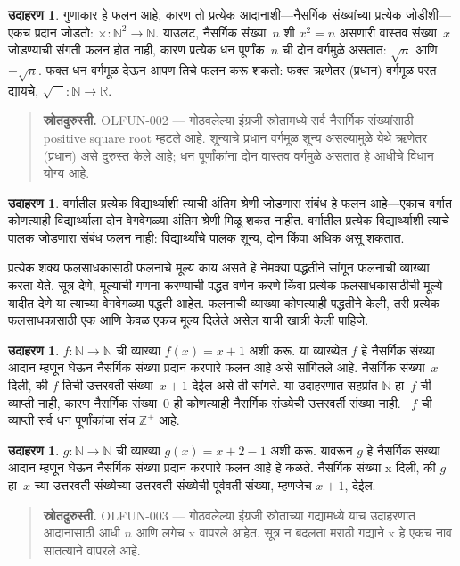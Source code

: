 \documentclass[11pt,a4paper,openany]{book}
\theoremstyle{definition}
\newtheorem{ex}[defn]{उदाहरण}
\newenvironment{explain}{}{}
\newcommand{\Nat}{\mathbb{N}}
\newcommand{\Int}{\mathbb{Z}}
\newcommand{\Real}{\mathbb{R}}
\begin{document}
\begin{ex}
गुणाकार हे फलन आहे, कारण तो प्रत्येक आदानाशी---नैसर्गिक संख्यांच्या
प्रत्येक जोडीशी---एकच प्रदान जोडतो: $\times \colon \Nat^2 \to \Nat$.
याउलट, नैसर्गिक संख्या~$n$ शी $x^2 = n$ असणारी वास्तव संख्या~$x$
जोडण्याची संगती फलन होत नाही, कारण प्रत्येक धन पूर्णांक~$n$ ची दोन
वर्गमुळे असतात: $\sqrt{n}$ आणि~$-\sqrt{n}$. फक्त धन वर्गमूळ देऊन
आपण तिचे फलन करू शकतो: फक्त ऋणेतर (प्रधान) वर्गमूळ परत द्यायचे,
$\sqrt{\phantom{X}} \colon \Nat \to \Real$.
\end{ex}
\begin{quote}\small\textbf{स्रोतदुरुस्ती.} OLFUN-002 — गोठवलेल्या इंग्रजी स्रोतामध्ये सर्व नैसर्गिक संख्यांसाठी positive square root म्हटले आहे. शून्याचे प्रधान वर्गमूळ शून्य असल्यामुळे येथे ऋणेतर (प्रधान) असे दुरुस्त केले आहे; धन पूर्णांकांना दोन वास्तव वर्गमुळे असतात हे आधीचे विधान योग्य आहे.\end{quote}

\begin{ex}
वर्गातील प्रत्येक विद्यार्थ्याशी त्याची अंतिम श्रेणी जोडणारा संबंध हे
फलन आहे---एकाच वर्गात कोणत्याही विद्यार्थ्याला दोन वेगवेगळ्या अंतिम
श्रेणी मिळू शकत नाहीत. वर्गातील प्रत्येक विद्यार्थ्याशी त्याचे पालक
जोडणारा संबंध फलन नाही: विद्यार्थ्यांचे पालक शून्य, दोन किंवा अधिक असू शकतात.
\end{ex}

\begin{explain}
प्रत्येक शक्य फलसाधकासाठी फलनाचे मूल्य काय असते हे नेमक्या पद्धतीने
सांगून फलनाची व्याख्या करता येते. सूत्र देणे, मूल्याची गणना करण्याची
पद्धत वर्णन करणे किंवा प्रत्येक फलसाधकासाठीची मूल्ये यादीत देणे या
त्याच्या वेगवेगळ्या पद्धती आहेत. फलनाची व्याख्या कोणत्याही पद्धतीने
केली, तरी प्रत्येक फलसाधकासाठी एक आणि केवळ एकच मूल्य दिलेले असेल
याची खात्री केली पाहिजे.
\end{explain}


\begin{ex}
$f \colon \Nat \to \Nat$ ची व्याख्या $f(x) = x+1$ अशी करू.
या व्याख्येत $f$ हे नैसर्गिक संख्या आदान म्हणून घेऊन नैसर्गिक संख्या
प्रदान करणारे फलन आहे असे सांगितले आहे. नैसर्गिक संख्या~$x$ दिली,
की $f$ तिची उत्तरवर्ती संख्या~$x+1$ देईल असे ती सांगते.
या उदाहरणात सहप्रांत $\Nat$ हा~$f$ ची व्याप्ती नाही, कारण नैसर्गिक
संख्या~$0$ ही कोणत्याही नैसर्गिक संख्येची उत्तरवर्ती संख्या नाही.
~$f$ ची व्याप्ती सर्व धन पूर्णांकांचा संच $\Int^{+}$ आहे.
\end{ex}

\begin{ex}\label{sfr:fun:bas:examplefunext}
$g \colon \Nat \to \Nat$ ची व्याख्या $g(x) = x+2-1$ अशी करू.
यावरून $g$ हे नैसर्गिक संख्या आदान म्हणून घेऊन नैसर्गिक संख्या प्रदान
करणारे फलन आहे हे कळते. नैसर्गिक संख्या x दिली, की $g$ हा~$x$ च्या
उत्तरवर्ती संख्येच्या उत्तरवर्ती संख्येची पूर्ववर्ती संख्या,
म्हणजेच $x+1$, देईल.
\end{ex}
\begin{quote}\small\textbf{स्रोतदुरुस्ती.} OLFUN-003 — गोठवलेल्या इंग्रजी स्रोताच्या गद्यामध्ये याच उदाहरणात आदानासाठी आधी $n$ आणि लगेच x वापरले आहेत. सूत्र न बदलता मराठी गद्याने x हे एकच नाव सातत्याने वापरले आहे.\end{quote}
\end{document}
